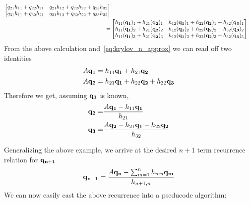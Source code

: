 \begin{example}
\begin{align*}
\begin{bmatrix}
				q_{21}h_{11} + q_{22}h_{21} & q_{21}h_{12} + q_{22}h_{22} + q_{23}h_{32}\\
				q_{31}h_{11} + q_{32}h_{21} & q_{31}h_{12} + q_{32}h_{22}+ q_{33}h_{32}
			\end{bmatrix}\\		
			=&
			\begin{bmatrix}
				h_{11}(\vectorbold{q_1})_1 + h_{21}(\vectorbold{q_2})_1 & h_{12}(\vectorbold{q_1})_1 + h_{22}(\vectorbold{q_2})_1 + h_{32}(\vectorbold{q_3})_1 \\
				h_{11}(\vectorbold{q_1})_2 + h_{21}(\vectorbold{q_2})_2 & h_{12}(\vectorbold{q_1})_2 + h_{22}(\vectorbold{q_2})_2 + h_{32}(\vectorbold{q_3})_2 \\
				h_{11}(\vectorbold{q_1})_3 + h_{21}(\vectorbold{q_2})_3 & h_{12}(\vectorbold{q_1})_3 + h_{22}(\vectorbold{q_2})_3 + h_{32}(\vectorbold{q_3})_3
			\end{bmatrix}
	\end{align*}
	From the above calculation and~\ref{eq:krylov_n_approx} we can read off two identities
	\begin{align*}
		A\vectorbold{q_1} &= h_{11}\vectorbold{q_1}+h_{21}\vectorbold{q_2}\\
		A\vectorbold{q_2} &= h_{21}\vectorbold{q_1}+h_{22}\vectorbold{q_2} + h_{32}\vectorbold{q_3}
	\end{align*}
	Therefore we get, assuming \(\vectorbold{q_1}\) is known,
	\begin{align*}
		\vectorbold{q_2} =& \frac{A \vectorbold{q_1} - h_{11} \vectorbold{q_1}}{h_{21}}\\
		\vectorbold{q_3} =& \frac{A \vectorbold{q_2} - h_{21} \vectorbold{q_1} - h_{22}\vectorbold{q_2}}{h_{32}}
	\end{align*}
\end{example}
Generalizing the above example, we arrive at the desired \(n+1\) term recurrence relation for \(\vectorbold{q_{n+1}}\)
\begin{equation}
	\vectorbold{q_{n+1}} = \frac{A \vectorbold{q_n} - \sum_{m=1}^{n} h_{mn}\vectorbold{q_m}}{h_{n+1,n}}
	\label{eq:arnoldi_recurrence}
\end{equation}
We can now easily cast the above recurrence into a pseducode algorithm:
